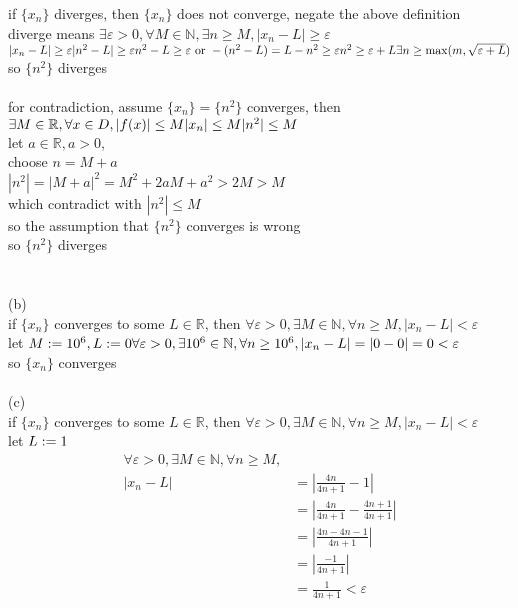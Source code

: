 \documentclass[12pt, border = 4pt, multi]{article} %
\begin{document}
if $\{x_n\}$ diverges, then $\{x_n\}$ does not converge, negate the above definition\\
diverge means $\exists \varepsilon > 0, \forall M \in \mathbb{N}, \exists n \geq M, |x_n - L| \geq \varepsilon$\\
$|x_n - L| \geq \varepsilon\\
|n ^ 2 - L| \geq \varepsilon\\
n ^ 2 - L \geq \varepsilon \text{ or } -(n ^ 2 - L) = L - n ^ 2 \geq \varepsilon\\
n ^ 2 \geq \varepsilon + L\\
\exists n \geq \max(m, \sqrt{\varepsilon + L})\\$
so $\{n ^ 2\}$ diverges\\
\\
for contradiction, assume $\{x_n\} = \{n ^ 2\}$ converges, then $\exists M \in \mathbb{R}, \forall x \in D, |f(x)| \leq M\\
|x_n| \leq M\\
|n ^ 2| \leq M$\\
let $a \in \mathbb{R}, a > 0$,\\
choose $n = M + a$\\
$|n ^ 2| = |M + a| ^ 2 = M ^ 2 + 2aM + a ^ 2 > 2M > M$\\
which contradict with $|n ^ 2| \leq M$\\
so the assumption that $\{n ^ 2\}$ converges is wrong\\
so $\{n ^ 2\}$ diverges\\
\\
\\
(b)\\
if $\{x_n\}$ converges to some $L \in \mathbb{R}$, then $\forall \varepsilon > 0, \exists M \in \mathbb{N}, \forall n \geq M, |x_n - L| < \varepsilon$\\
let $M := 10 ^ 6,\\
L := 0\\
\forall \varepsilon > 0, \exists 10 ^ 6 \in \mathbb{N}, \forall n \geq 10 ^ 6, |x_n - L| = |0 - 0| = 0 < \varepsilon$\\
so $\{x_n\}$ converges\\
\\
\newpage
\noindent
(c)\\
if $\{x_n\}$ converges to some $L \in \mathbb{R}$, then $\forall \varepsilon > 0, \exists M \in \mathbb{N}, \forall n \geq M, |x_n - L| < \varepsilon$\\
let $L := 1\\$
\begin{align*}
\forall \varepsilon > 0, \exists M \in \mathbb{N}, \forall n \geq M,&\\
|x_n - L| &= \left|\frac{4n}{4n + 1} - 1\right|\\
&= \left|\frac{4n}{4n + 1} - \frac{4n + 1}{4n + 1}\right|\\
&= \left|\frac{4n - 4n - 1}{4n + 1}\right|\\
&= \left|\frac{-1}{4n + 1}\right|\\
&= \frac{1}{4n + 1} < \varepsilon
\end{align*}
\end{document}
